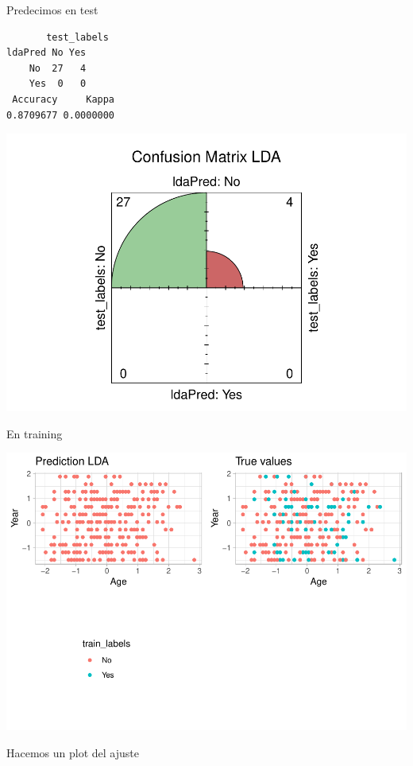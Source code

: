 \documentclass[
]{article}
\begin{document}
Predecimos en test

\begin{verbatim}
       test_labels
ldaPred No Yes
    No  27   4
    Yes  0   0
 Accuracy     Kappa 
0.8709677 0.0000000 
\end{verbatim}

\begin{center}\includegraphics{Clasificacion_files/figure-latex/unnamed-chunk-23-1} \end{center}

En training

\begin{center}\includegraphics{Clasificacion_files/figure-latex/unnamed-chunk-24-1} \end{center}

Hacemos un plot del ajuste
\end{document}
